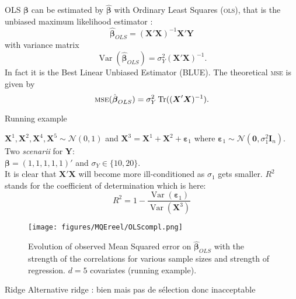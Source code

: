 \documentclass[11pt]{beamer}
\begin{document}
		\begin{frame}{OLS}
		$\boldsymbol{\beta}$ can be estimated by $\hat{\boldsymbol{\beta}}$ with Ordinary Least Squares (\textsc{ols}), that is the unbiased maximum likelihood estimator \cite{saporta2006probabilites,dodge2004analyse}: %
	\begin{equation}
		\boldsymbol{\hat{\beta}}_{OLS}=\left(\boldsymbol{X}'\boldsymbol{X} \right) ^{-1}\boldsymbol{X}'\boldsymbol{Y}\label{betaOLS}
	\end{equation}
	with variance matrix
	\begin{equation}
		\operatorname{Var}(\hat{\boldsymbol{\beta}}_{OLS})=\sigma_Y^2\left(\boldsymbol{X}'\boldsymbol{X} \right) ^{-1}. \label{eq:varOLS}
	\end{equation}
	 In fact it is the Best Linear Unbiased Estimator (BLUE).
	 The theoretical \textsc{mse} is given by
	\begin{equation}
	\textsc{mse}(\hat{\boldsymbol{\beta}}_{OLS})= \sigma_Y^2 \operatorname{Tr}((\boldsymbol{X}'\boldsymbol{X})^{-1}). \nonumber 
	\end{equation}
		\end{frame}
		
\begin{frame}{Running example}

$\boldsymbol{X}^1,\boldsymbol{X}^2,\boldsymbol{X}^4,\boldsymbol{X}^5  \sim \mathcal{N}(0,1)$  and 
$\boldsymbol{X}^3=\boldsymbol{X}^1+\boldsymbol{X}^2+\boldsymbol{\varepsilon}_1$ where 
$\boldsymbol{\varepsilon}_1\sim{\mathcal{N}(\boldsymbol{0},\sigma_1^2\boldsymbol{I}_n)}$. \\
Two {\it scenarii} for $\boldsymbol{Y}$:\\
 $\boldsymbol{\beta}=(1,1,1,1,1)'$ and $\sigma_Y \in \{10,20\}$.
 \\
It is clear that $\boldsymbol{X}'\boldsymbol{X}$ will become more ill-conditioned as $\sigma_1$ gets smaller. $R^2$ stands for the coefficient of determination which is here:
	\begin{equation}\label{defR2}
	R^2=1-\frac{\operatorname{Var}(\boldsymbol{\varepsilon}_1)}{\operatorname{Var}(\boldsymbol{X}^3)}
	\end{equation}

\end{frame}	
	
	\begin{frame}
	\begin{figure}
	 \centering
	  \texttt{[image: figures/MQEreel/OLScompl.png]}
	  \caption{Evolution of observed Mean Squared error on $\hat{\boldsymbol{\beta}}_{OLS}$ with the strength of the correlations for various sample sizes and strength of regression. $d=5$ covariates (running example). } \label{MQEOLScompl}
	\end{figure}	
\end{frame}		
		\begin{frame}{Ridge}
		Alternative ridge : bien mais pas de sélection donc inacceptable
		\end{frame}
		
\end{document}
